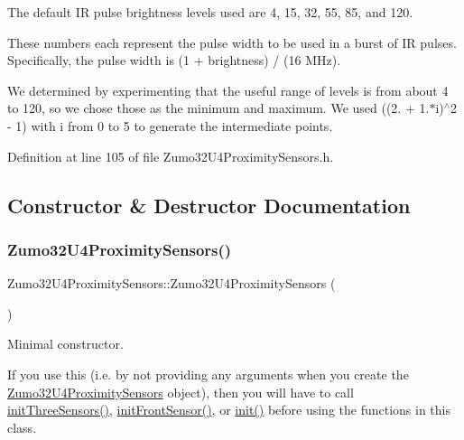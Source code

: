 The default IR pulse brightness levels used are 4, 15, 32, 55, 85, and 120.

These numbers each represent the pulse width to be used in a burst of IR pulses. Specifically, the pulse width is (1 + brightness) / (16 M\+Hz).

We determined by experimenting that the useful range of levels is from about 4 to 120, so we chose those as the minimum and maximum. We used ((2. + 1.$\ast$i)$^\wedge$2 -\/ 1) with i from 0 to 5 to generate the intermediate points. 

Definition at line 105 of file Zumo32\+U4\+Proximity\+Sensors.\+h.



\subsection{Constructor \& Destructor Documentation}
\mbox{\label{class_zumo32_u4_proximity_sensors_a73a7f00157adb39ba403649160f0f73b}} 
\subsubsection{\texorpdfstring{Zumo32\+U4\+Proximity\+Sensors()}{Zumo32U4ProximitySensors()}\hspace{0.1cm}{\footnotesize\ttfamily [1/2]}}
{\footnotesize\ttfamily Zumo32\+U4\+Proximity\+Sensors\+::\+Zumo32\+U4\+Proximity\+Sensors (\begin{DoxyParamCaption}{ }\end{DoxyParamCaption})\hspace{0.3cm}{\ttfamily [inline]}}



Minimal constructor. 

If you use this (i.\+e. by not providing any arguments when you create the \hyperlink{class_zumo32_u4_proximity_sensors}{Zumo32\+U4\+Proximity\+Sensors} object), then you will have to call \hyperlink{class_zumo32_u4_proximity_sensors_a521c7fe0992317c0566ff59ec132b469}{init\+Three\+Sensors()}, \hyperlink{class_zumo32_u4_proximity_sensors_abcc9c393f47cf994f06d9cae51369a6a}{init\+Front\+Sensor()}, or \hyperlink{class_zumo32_u4_proximity_sensors_a250ef26e66807bc800adc42be912fab5}{init()} before using the functions in this class. 

